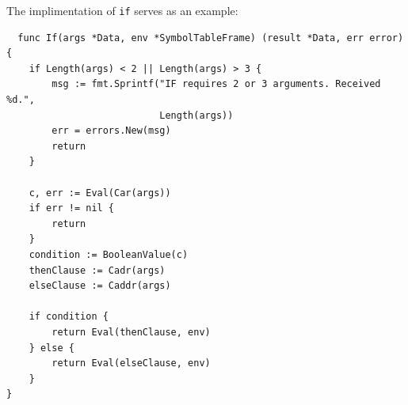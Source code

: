 \documentclass[12pt]{article}
\begin{document}
The implimentation of \verb|if| serves as an example:

\begin{verbatim}
  func If(args *Data, env *SymbolTableFrame) (result *Data, err error) {
    if Length(args) < 2 || Length(args) > 3 {
        msg := fmt.Sprintf("IF requires 2 or 3 arguments. Received %d.", 
                           Length(args))
        err = errors.New(msg)
        return
    }

    c, err := Eval(Car(args))
    if err != nil {
        return
    }
    condition := BooleanValue(c)
    thenClause := Cadr(args)
    elseClause := Caddr(args)

    if condition {
        return Eval(thenClause, env)
    } else {
        return Eval(elseClause, env)
    }
}

\end{verbatim}



\end{document}
